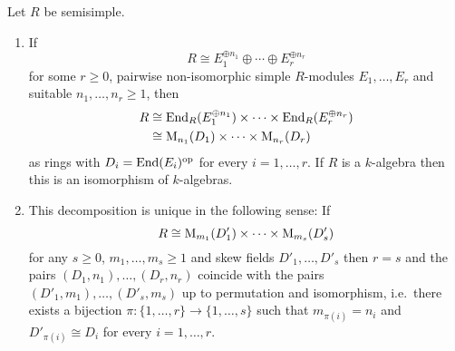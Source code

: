 \begin{theorem}
  \label{theorem: artin wedderburn theorem}
  Let $R$ be semisimple.
  \begin{enumerate}
    \item
      If
      \[
              R
        \cong E_1^{\oplus n_1} \oplus \dotsb \oplus E_r^{\oplus n_r}
      \]
      for some $r \geq 0$, pairwise non-isomorphic simple $R$-modules $E_1, \dotsc, E_r$ and suitable $n_1, \dotsc, n_r \geq 1$, then
      \begin{align*}
                R
        &\cong  \operatorname{End}_R(E_1^{\oplus n_1}) \times \dotsb \times \operatorname{End}_R(E_r^{\oplus n_r})  \\
        &\cong  \operatorname{M}_{n_1}(D_1) \times \dotsb \times  \operatorname{M}_{n_r}(D_r)
      \end{align*}
      as rings with $D_i = \operatorname{End}(E_i)^{\operatorname{op}}$ for every $i = 1, \dotsc, r$.
      If $R$ is a $k$-algebra then this is an isomorphism of $k$-algebras.
    \item
      This decomposition is unique in the following sense:
      If
      \[
              R
        \cong \operatorname{M}_{m_1}(D'_1) \times \dotsb \times \operatorname{M}_{m_s}(D'_s)
      \]
      for any $s \geq 0$, $m_1, \dotsc, m_s \geq 1$ and skew fields $D'_1, \dotsc, D'_s$ then $r = s$ and the pairs $(D_1, n_1), \dotsc, (D_r, n_r)$ coincide with the pairs $(D'_1, m_1), \dotsc, (D'_s, m_s)$ up to permutation and isomorphism, i.e.\ there exists a bijection $\pi \colon \{1, \dotsc, r\} \to \{1, \dotsc, s\}$ such that $m_{\pi(i)} = n_i$ and $D'_{\pi(i)} \cong D_i$ for every $i = 1, \dotsc, r$.
  \end{enumerate}
\end{theorem}



